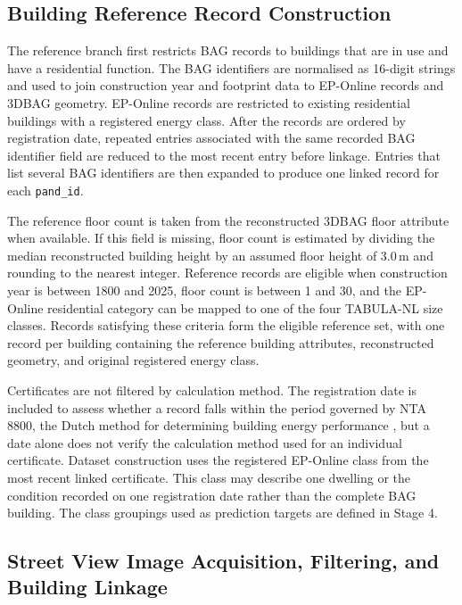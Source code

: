 \subsection{Building Reference Record Construction}
\label{sec:reference_dataset_construction}

The reference branch first restricts BAG records to buildings that are in use and have a residential function.
The BAG identifiers are normalised as 16-digit strings and used to join construction year and footprint data to EP-Online records and 3DBAG geometry.
EP-Online records are restricted to existing residential buildings with a registered energy class.
After the records are ordered by registration date, repeated entries associated with the same recorded BAG identifier field are reduced to the most recent entry before linkage.
Entries that list several BAG identifiers are then expanded to produce one linked record for each \texttt{pand\_id}.

The reference floor count is taken from the reconstructed 3DBAG floor attribute when available.
If this field is missing, floor count is estimated by dividing the median reconstructed building height by an assumed floor height of 3.0\,m and rounding to the nearest integer.
Reference records are eligible when construction year is between 1800 and 2025, floor count is between 1 and 30, and the EP-Online residential category can be mapped to one of the four TABULA-NL size classes.
Records satisfying these criteria form the eligible reference set, with one record per building containing the reference building attributes, reconstructed geometry, and original registered energy class.

Certificates are not filtered by calculation method.
The registration date is included to assess whether a record falls within the period governed by NTA 8800, the Dutch method for determining building energy performance \parencite{NTA8800}, but a date alone does not verify the calculation method used for an individual certificate.
Dataset construction uses the registered EP-Online class from the most recent linked certificate.
This class may describe one dwelling or the condition recorded on one registration date rather than the complete BAG building.
The class groupings used as prediction targets are defined in Stage 4.

\subsection{Street View Image Acquisition, Filtering, and Building Linkage}
\label{sec:svi_acquisition_matching}

